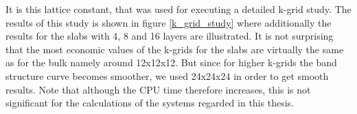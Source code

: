 	It is this lattice constant, that was used for executing a detailed k-grid study. The results of this study is shown in figure \ref{k_grid_study} where additionally the results for the slabs with 4, 8 and 16 layers are illustrated.  
	It is not surprising that the most economic values of the k-grids for the slabs are virtually the same as for the bulk namely around 12x12x12. But since for higher k-grids the band structure curve becomes smoother, we used 24x24x24 in order to get smooth results. 
	Note that although the CPU time therefore increases, this is not significant for the calculations of the systems regarded in this thesis. 
